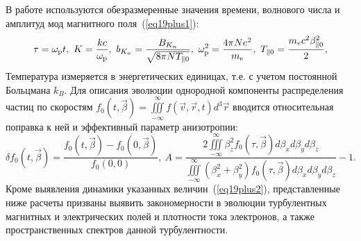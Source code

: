 В работе используются обезразмеренные значения времени, волнового числа и амплитуд мод магнитного поля~(\ref{eq19plus1}):
\begin{equation}
\label{eq19plus1}
   \tau=\wpl t, \
    K=\dfrac{kc}{\wpl}, \  b_{K_{n}}=\dfrac{B_{K_{n}}}{\sqrt{8\pi N T_{\|0}}},\ 
    \wpl^2=\dfrac{4\pi Ne^2}{\me},\
    T_{\|0}=\dfrac{m_ec^2\beta_{\|0}^2}{2},
\end{equation}
Температура измеряется в энергетических единицах, т.е. с учетом постоянной Больцмана $k_B$. Для описания эволюции однородной компоненты распределения частиц по скоростям $f_0(t,\overrightarrow{\beta})=\iiint\limits^{\infty}_{-\infty}f(\vec{v},\vec{r}, t) d^3\vec{r}$ вводится относительная поправка к ней и эффективный параметр анизотропии:
\begin{equation}
\label{eq19plus2}
    \delta f_{0}(t,\overrightarrow{\beta})=\frac{f_0(t,\overrightarrow{\beta})-f_0(0,\overrightarrow{\beta})}{f_0(0,0)},\ A=\frac{2\iiint\limits^{\infty}_{-\infty}\beta_z^2f_{0}(\tau,\overrightarrow{\beta}) d\beta_x d\beta_yd\beta_z}{\iiint\limits^{\infty}_{-\infty}\left(\beta_x^2+\beta_y^2\right)f_{0}(\tau,\overrightarrow{\beta}) d\beta_x d\beta_y d\beta_z}-1 .   
\end{equation}
Кроме выявления динамики указанных величин~(\ref{eq19plus2}), представленные ниже расчеты призваны выявить закономерности в эволюции турбулентных магнитных и электрических полей и плотности тока электронов, а также пространственных спектров данной турбулентности.

